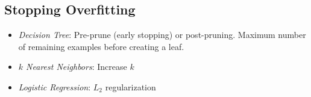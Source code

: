\documentclass[10pt]{article}
\begin{document}
\begin{multicols}{3}
  \section*{Stopping Overfitting}
  \begin{itemize}
    \item \textit{Decision Tree}: Pre-prune (early stopping) or post-pruning.  Maximum number of remaining examples before creating a leaf.
    \item \textit{$k$ Nearest Neighbors}: Increase $k$
    \item \textit{Logistic Regression}: $L_2$ regularization
  \end{itemize}
\end{multicols}
\end{document}
